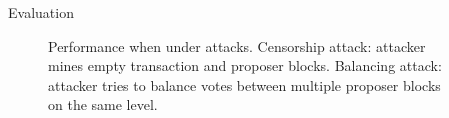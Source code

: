 \documentclass[final]{beamer}
\newlength{\sepwidth}
\newlength{\colwidth}
\newcommand{\separatorcolumn}{\begin{column}{\sepwidth}\end{column}}
\begin{document}
\begin{frame}[t]
\begin{columns}[t]
\begin{column}{\colwidth}
\begin{block}{Evaluation}
	\begin{figure}
      \centering
      \caption{Performance when under attacks. Censorship attack: attacker mines empty transaction and proposer blocks. Balancing attack: attacker tries to balance votes between multiple proposer blocks on the same level.}
  \end{figure}
    
\end{block}






\end{column}

\separatorcolumn
\end{columns}
\end{frame}
\end{document}
